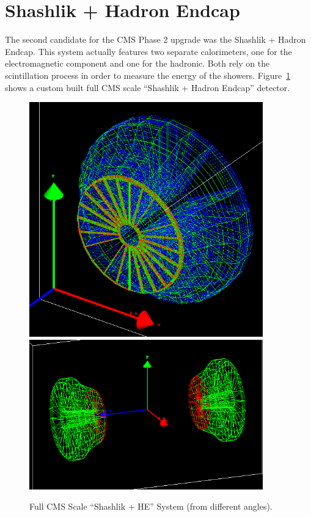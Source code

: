 \section{Shashlik + Hadron Endcap} \label{section:simulations_shashlik}
The second candidate for the CMS Phase 2 upgrade was the Shashlik + Hadron Endcap. This system actually features two separate calorimeters, one for the electromagnetic component and one for the hadronic. Both rely on the scintillation process in order to measure the energy of the showers. Figure~\ref{fig:higgs_simulations_shashlikexamples} shows a custom built full CMS scale ``Shashlik + Hadron Endcap'' detector.
\begin{figure}[htbp]
    \centering
    \includegraphics[width=0.9\textwidth]{figures/ch_simulations/shashlik/geometry/Shashlik+HE_Complete_Wire.png}\\
    \includegraphics[width=0.9\textwidth]{figures/ch_simulations/shashlik/geometry/SHE_70_20.png}
    \caption{Full CMS Scale ``Shashlik + HE'' System (from different angles).}
    \label{fig:higgs_simulations_shashlikexamples}
 \end{figure}

